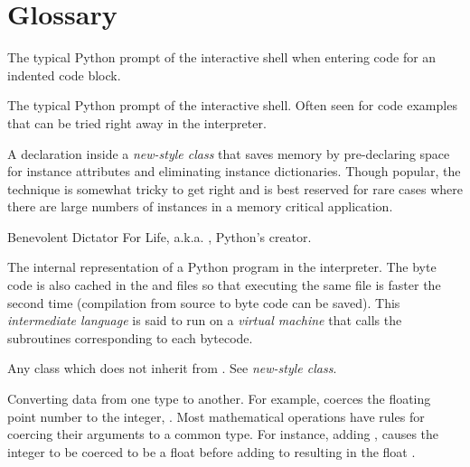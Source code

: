 \chapter{Glossary\label{glossary}}


\begin{description}

\item[\code{.\code{.}.}]
The typical Python prompt of the interactive shell when entering code
for an indented code block.

\index{>>>}
\item[\code{>\code{>}>}]
The typical Python prompt of the interactive shell.  Often seen for
code examples that can be tried right away in the interpreter.

\item[__slots__]
A declaration inside a \emph{new-style class} that saves memory by
pre-declaring space for instance attributes and eliminating instance
dictionaries.  Though popular, the technique is somewhat tricky to get
right and is best reserved for rare cases where there are large
numbers of instances in a memory critical application.

\item[BDFL]
Benevolent Dictator For Life, a.k.a. , Python's creator.

\item[byte code]
The internal representation of a Python program in the interpreter.
The byte code is also cached in the  and 
files so that executing the same file is faster the second time
(compilation from source to byte code can be saved).  This
\emph{intermediate language} is said to run on a \emph{virtual
machine} that calls the subroutines corresponding to each bytecode.

\item[classic class]
Any class which does not inherit from .  See
\emph{new-style class}.

\item[coercion]
Converting data from one type to another.  For example,
{} coerces the floating point number to the integer,
{}.  Most mathematical operations have rules for coercing
their arguments to a common type.  For instance, adding , causes the integer  to be coerced to be a float
{} before adding to  resulting in the float
{}.


\end{description}
